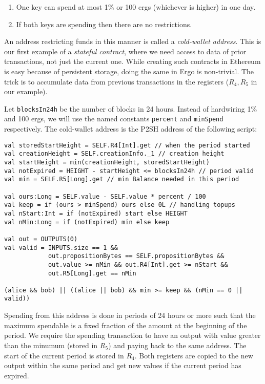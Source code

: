 \documentclass[runningheads]{llncs}
\begin{document}
\begin{enumerate}
	\item One key can spend at most 1\% or 100 ergs (whichever is higher) in one day.
	\item If both keys are spending then there are no restrictions. 
\end{enumerate}

An address restricting funds in this manner is called a {\em cold-wallet address}. 
This is our first example of a {\em stateful contract}, where we need access to 
data of prior transactions, not just the current one. While creating such contracts in Ethereum is easy because of persistent storage, doing the same in Ergo is non-trivial.
The trick is to accumulate data from previous transactions in the registers ($R_4, R_5$ in our example).

Let \texttt{blocksIn24h} be the number of blocks in 24 hours. Instead of hardwiring 1\% and 100 ergs, we will use the named constants \texttt{percent} and \texttt{minSpend} respectively. The cold-wallet address is the P2SH address of the following script:
\begin{verbatim}
val storedStartHeight = SELF.R4[Int].get // when the period started
val creationHeight = SELF.creationInfo._1 // creation height
val startHeight = min(creationHeight, storedStartHeight) 
val notExpired = HEIGHT - startHeight <= blocksIn24h // period valid
val min = SELF.R5[Long].get // min Balance needed in this period

val ours:Long = SELF.value - SELF.value * percent / 100
val keep = if (ours > minSpend) ours else 0L // handling topups
val nStart:Int = if (notExpired) start else HEIGHT
val nMin:Long = if (notExpired) min else keep

val out = OUTPUTS(0)  
val valid = INPUTS.size == 1 && 
            out.propositionBytes == SELF.propositionBytes &&
            out.value >= nMin && out.R4[Int].get >= nStart && 
            out.R5[Long].get == nMin
 
(alice && bob) || ((alice || bob) && min >= keep && (nMin == 0 || valid))
\end{verbatim}

Spending from this address is done in periods of 24 hours or more such that the maximum spendable is a fixed fraction of the amount at the beginning of the period. We require the spending transaction to have an output with value greater than the minumum (stored in $R_5$) and paying back to the same address. The start of the current period is stored in $R_4$. Both registers are copied to the new output within the same period and get new values if the current period has expired. 
\end{document}
